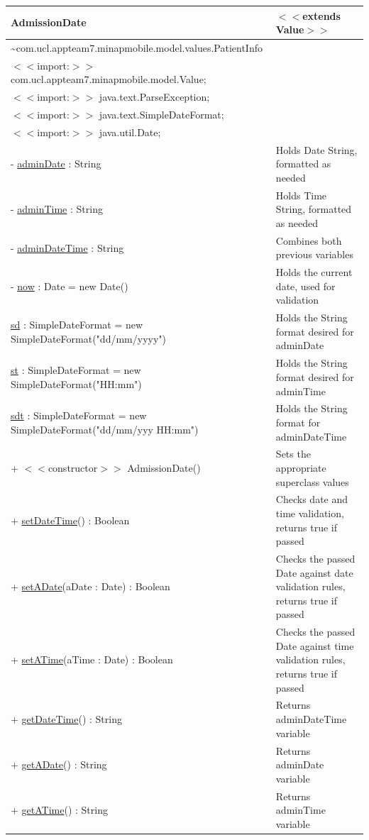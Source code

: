 \documentclass[12pt,a4paper,oneside,titlepage]{article}
\begin{document}
\begin{center}
	\begin{tabular}{| p{13cm} | p{5cm} |}
	\hline
	\textbf{AdmissionDate} & \textbf{$<<$extends Value$>>$} \\ \hline
	\textasciitilde com.ucl.appteam7.minapmobile.model.values.PatientInfo & \\ \hline
	$<<$import:$>>$ com.ucl.appteam7.minapmobile.model.Value; & \\ \hline
	$<<$import:$>>$ java.text.ParseException; & \\ \hline
	$<<$import:$>>$ java.text.SimpleDateFormat; & \\ \hline
	$<<$import:$>>$ java.util.Date; & \\ \hline \hline
	- \underline{adminDate} : String & Holds Date String, formatted as needed \\ \hline
	- \underline{adminTime} : String & Holds Time String, formatted as needed \\ \hline
	- \underline{adminDateTime} : String & Combines both previous variables \\ \hline
	- \underline{now} : Date = new Date() & Holds the current date, used for validation \\ \hline
	\underline{sd} : SimpleDateFormat = new SimpleDateFormat("dd/mm/yyyy") & Holds the String format desired for adminDate \\ \hline
	\underline{st} : SimpleDateFormat = new SimpleDateFormat("HH:mm") & Holds the String format desired for adminTime \\ \hline
	\underline{sdt} : SimpleDateFormat = new SimpleDateFormat("dd/mm/yyy HH:mm") & Holds the String format for adminDateTime \\ \hline \hline
	+ $<<$constructor$>>$ AdmissionDate() & Sets the appropriate superclass values \\ \hline
	+ \underline{setDateTime}() : Boolean & Checks date and time validation, returns true if passed \\ \hline
	+ \underline{setADate}(aDate : Date) : Boolean & Checks the passed Date against date validation rules, returns true if passed \\ \hline
	+ \underline{setATime}(aTime : Date) : Boolean & Checks the passed Date against time validation rules, returns true if passed \\ \hline
	+ \underline{getDateTime}() : String & Returns adminDateTime variable \\ \hline
	+ \underline{getADate}() : String & Returns adminDate variable \\ \hline
	+ \underline{getATime}() : String & Returns adminTime variable \\ \hline
	\end{tabular}
\end{center}
\end{document}
